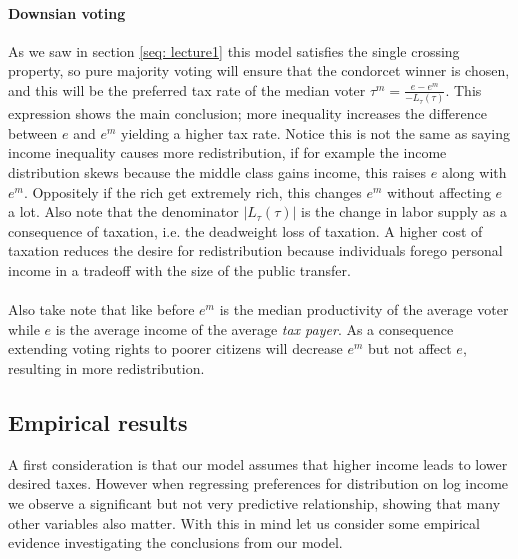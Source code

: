 \paragraph{Downsian voting} As we saw in section \ref{seq: lecture1} this model satisfies the single crossing property, so pure majority voting will ensure that the condorcet winner is chosen, and this will be the preferred tax rate of the median voter $\tau^m=\frac{e-e^m}{-L_{\tau}(\tau)}$. This expression shows the main conclusion; more inequality increases the difference between $e$ and $e^m$ yielding a higher tax rate. Notice this is not the same as saying income inequality causes more redistribution, if for example the income distribution skews because the middle class gains income, this raises $e$ along with $e^m$. Oppositely if the rich get extremely rich, this changes $e^m$ without affecting $e$ a lot. Also note that the denominator $|L_{\tau}(\tau)|$ is the change in labor supply as a consequence of taxation, i.e. the deadweight loss of taxation. A higher cost of taxation reduces the desire for redistribution because individuals forego personal income in a tradeoff with the size of the public transfer. 
\\ \\ 
Also take note that like before $e^m$ is the median productivity of the average voter while $e$ is the average income of the average \emph{tax payer}. As a consequence extending voting rights to poorer citizens will decrease $e^m$ but not affect $e$, resulting in more redistribution.

\subsection{Empirical results}
A first consideration is that our model assumes that higher income leads to lower desired taxes. However when regressing preferences for distribution on log income we observe a significant but not very predictive relationship, showing that many other variables also matter. With this in mind let us consider some empirical evidence investigating the conclusions from our model.
